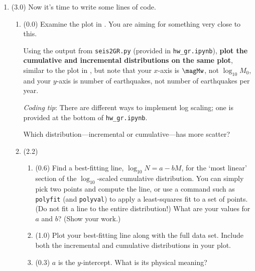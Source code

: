\documentclass[11pt,titlepage,fleqn]{article}
\newcommand{\tfile}{{\tt hw\_gr.ipynb}}
\begin{document}
\begin{enumerate}
\begin{enumerate}
What is its magnitude interval?

\end{enumerate}


\item (3.0) Now it's time to write some lines of code.

\begin{enumerate}
\item (0.0) Examine the plot in \citet[][Figure~4.7-2]{SteinWysession}. You are aiming for something very close to this.

Using the output from \verb+seis2GR.py+ (provided in \tfile), {\bf plot the cumulative and incremental distributions on the same plot}, similar to the plot in \citet[][Figure~4.7-2]{SteinWysession}, but note that your $x$-axis is $\magMw$, not $\log_{10} M_0$, and your $y$-axis is number of earthquakes, not number of earthquakes per year.

{\em Coding tip}: There are different ways to implement log scaling; one is provided at the bottom of \tfile.

Which distribution---incremental or cumulative---has more scatter?

\pagebreak

\item (2.2)
\begin{enumerate}
\item (0.6) Find a best-fitting line, $\log_{10} N = a - b M$, for the `most linear' section of the $\log_{10}$-scaled cumulative distribution. You can simply pick two points and compute the line, or use a command such as \verb+polyfit+ (and \verb+polyval+) to apply a least-squares fit to a set of points. (Do not fit a line to the entire distribution!) What are your values for $a$ and $b$? (Show your work.)

\item (1.0) Plot your best-fitting line along with the full data set.
Include both the incremental and cumulative distributions in your plot.

\item (0.3) $a$ is the $y$-intercept. What is its physical meaning?


\end{enumerate}
\end{enumerate}
\end{enumerate}
\end{document}
